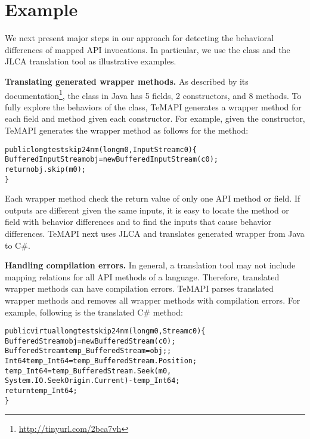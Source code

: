 \section{Example}
\label{sec:example}
We next present major steps in our approach for detecting the behavioral differences of mapped API invocations. In particular, we use the  class and the JLCA translation tool as illustrative examples.

\textbf{Translating generated wrapper methods.} As described by its documentation\footnote{\url{http://tinyurl.com/2bca7vh}}, the  class in Java has 5 fields, 2 constructors, and 8 methods. To fully explore the behaviors of the class, TeMAPI generates a wrapper method for each field and method given each constructor. For example, given the  constructor, TeMAPI generates the wrapper method as follows for the  method:

\begin{CodeOut}\vspace*{-1ex}
\begin{alltt}
public long testskip24nm(long m0,InputStream c0)\{
  BufferedInputStream obj = new BufferedInputStream(c0);
  return obj.skip(m0);
\}  
\end{alltt}
\end{CodeOut}\vspace*{-2ex}

Each wrapper method check the return value of only one API method or field. If outputs are different given the same inputs, it is easy to locate the method or field with behavior differences and to find the inputs that cause behavior differences. TeMAPI next uses JLCA and translates generated wrapper from Java to C\#.

\textbf{Handling compilation errors.} In general, a translation tool may not include mapping relations for all API methods of a language. Therefore, translated wrapper methods can have compilation errors. TeMAPI parses translated wrapper methods and removes all wrapper methods with compilation errors. For example, following is the translated C\#  method:

\begin{CodeOut}\vspace*{-1ex}
\begin{alltt}
public virtual long testskip24nm(long m0, Stream c0)\{
  BufferedStream obj = new BufferedStream(c0);
  BufferedStream temp_BufferedStream = obj;;
  Int64 temp_Int64 = temp_BufferedStream.Position;
  temp_Int64 = temp_BufferedStream.Seek(m0, 
        System.IO.SeekOrigin.Current) - temp_Int64;
  return temp_Int64;
\}
\end{alltt}
\end{CodeOut}\vspace*{-2ex}

